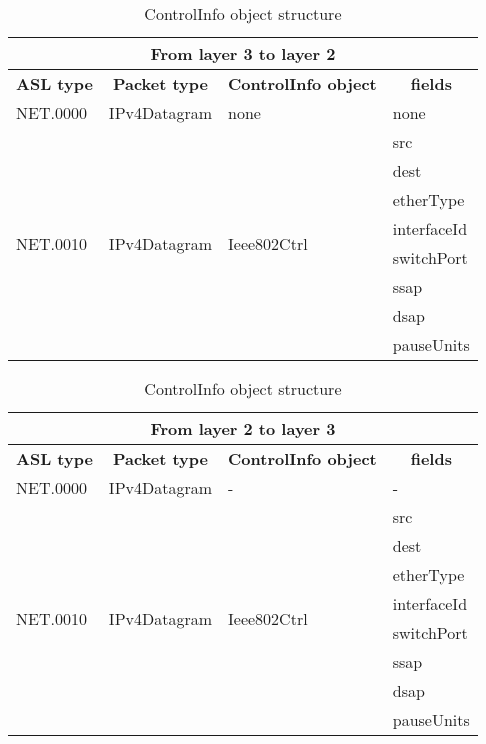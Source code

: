 \begin{table} [ppp]
\centering
\ttfamily
\footnotesize
\caption{ControlInfo object structure}
\label{tab:from3-to2}
\begin{tabular}{|l|l|l|l|}
\hline
\multicolumn{4}{|c|}{\normalfont\textbf{From layer 3 to layer 2}}	\\
\hline
\multicolumn{1}{|c|}{\normalfont\textbf{ASL type}}	&\multicolumn{1}{c|}{\normalfont\textbf{Packet type}}	&\multicolumn{1}{c|}{\normalfont\textbf{ControlInfo object}}		&\multicolumn{1}{c|}{\normalfont\textbf{fields}}\\
\hline
\multirow{1}{*}{NET.0000}&\multirow{1}{*}{IPv4Datagram}		&none	&none	\\
\hline
\multirow{8}{*}{NET.0010}&\multirow{8}{*}{IPv4Datagram}		&\multirow{8}{*}{Ieee802Ctrl}	&src			\\
												&						&									&dest		\\
												&					&									&etherType	\\
												&					&									&interfaceId	\\
												&					&									&switchPort	\\
												&					&									&ssap		\\
												&					&									&dsap		\\
												&					&									&pauseUnits	\\
\hline
\end{tabular}
\end{table}
%
\begin{table} [ppp]
\centering
\ttfamily
\footnotesize
\caption{ControlInfo object structure}
\label{tab:from2-to3}
\begin{tabular}{|l|l|l|l|}
\hline
\multicolumn{4}{|c|}{\normalfont\textbf{From layer 2 to layer 3}}	\\
\hline
\multicolumn{1}{|c|}{\normalfont\textbf{ASL type}}	&\multicolumn{1}{c|}{\normalfont\textbf{Packet type}}	&\multicolumn{1}{c|}{\normalfont\textbf{ControlInfo object}}		&\multicolumn{1}{c|}{\normalfont\textbf{fields}}\\
\hline
\multirow{1}{*}{NET.0000}&\multirow{1}{*}{IPv4Datagram}		&-						&-	\\
\hline
\multirow{8}{*}{NET.0010}&\multirow{8}{*}{IPv4Datagram}		&\multirow{8}{*}{Ieee802Ctrl}	&src			\\
												&						&									&dest		\\
												&						&									&etherType	\\
												&						&									&interfaceId	\\
												&						&									&switchPort	\\
												&						&									&ssap		\\
												&						&									&dsap		\\
												&						&									&pauseUnits	\\
\hline
\end{tabular}
\end{table}


